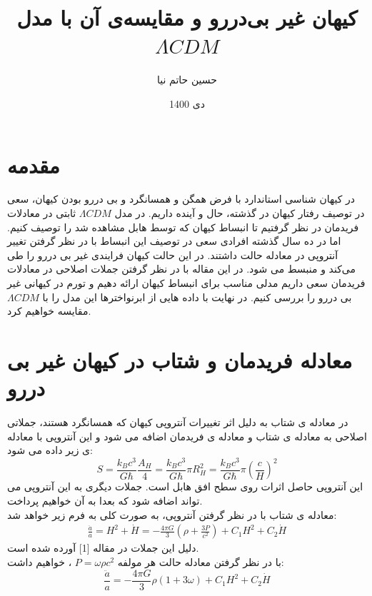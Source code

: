 \documentclass[12pt]{article}
\title{کیهان غیر بی‌دررو و مقایسه‌ی آن با مدل 
$\Lambda CDM$
}
\author{حسین حاتم نیا}
\date{دی 1400}
\begin{document}
\maketitle


\section*{مقدمه}
در کیهان شناسی استاندارد با فرض همگن و همسانگرد و بی دررو بودن کیهان، سعی در توصیف رفتار کیهان در گذشته، حال و آینده داریم. \newline در مدل 
$\Lambda CDM$
 ثابتی در معادلات فریدمان در نظر گرفتیم تا انبساط کیهان که توسط هابل مشاهده شد را توصیف کنیم. اما در ده سال گذشته افرادی سعی در توصیف این انبساط با در نظر گرفتن تغییر آنتروپی در معادله حالت داشتند.
در این حالت کیهان فرایندی غیر بی دررو را طی می‌کند و منبسط می شود. \newline
در این مقاله با در نظر گرفتن جملات اصلاحی در معادلات فریدمان سعی داریم مدلی مناسب برای انبساط کیهان ارائه دهیم و تورم در کیهانی غیر بی دررو
را بررسی کنیم. در نهایت با داده هایی از ابرنواخترها این مدل را با $\Lambda CDM$ مقایسه خواهیم کرد.


\setcounter{section}{-1}
\section{معادله فریدمان و شتاب در کیهان غیر بی دررو}
در معادله ی شتاب به دلیل اثر تغییرات آنتروپی کیهان که همسانگرد هستند، جملاتی اصلاحی به معادله ی شتاب و معادله ی فریدمان اضافه می شود و این آنتروپی با معادله ی زیر داده می شود:
\begin{equation}\label{ent}
S=\frac{k_Bc^3}{G\hbar}\frac{A_H}{4}=\frac{k_Bc^3}{G\hbar}\pi R_H^2=\frac{k_Bc^3}{G\hbar}\pi(\frac{c}{H})^2
\end{equation}
این آنتروپی حاصل اثرات روی سطح افق هابل است. جملات دیگری به این آنتروپی می تواند اضافه شود که بعدا به آن خواهیم پرداخت.\\
معادله ی شتاب با در نظر گرفتن آنتروپی، به صورت کلی به فرم زیر خواهد شد:
\begin{align}
\frac{\ddot a}{a}=H^2+\dot H 
					=-\frac{4\pi G}{3}(\rho + \frac{3P}{c^2})+C_1H^2+C_2\dot H
\end{align}
دلیل این جملات در مقاله [1] آورده شده است.\\
 با در نظر گرفتن معادله حالت هر مولفه 
$P=\omega \rho c^2$
 ، خواهیم داشت:
\begin{equation}
\frac{\ddot a}{a}=-\frac{4\pi G}{3}\rho(1 + 3\omega)+C_1H^2+C_2\dot H
\end{equation}
\end{document}
